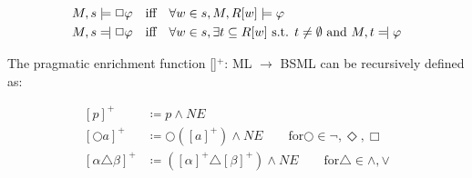 \begin{align*}
M, s &\models \Box \varphi \quad \text{iff} \quad \forall w \in s, M, R[w] \models \varphi \\
M, s &\leftmodels  \Box \varphi \quad \text{iff} \quad  \forall w \in s, \exists t \subseteq R[w] \text{ s.t. } t \neq \emptyset \text{ and } M, t \leftmodels \varphi 
\end{align*}

The pragmatic enrichment function [\quad]\(^+\): ML \(\rightarrow\) BSML can be recursively defined as:


\begin{align*}
{[p]}^+ &\coloneqq p \land NE \\
{[\bigcirc a]}^+ &\coloneqq \bigcirc({[a]}^+)\land NE  \quad \quad \text{for} \bigcirc \in {\neg,\Diamond,\Box}\\
{[\alpha \triangle \beta ]}^+ &\coloneqq ({[\alpha]}^+ \triangle {[\beta]}^+)\land NE \quad \quad \text{for} \triangle \in {\land, \lor}
\end{align*}